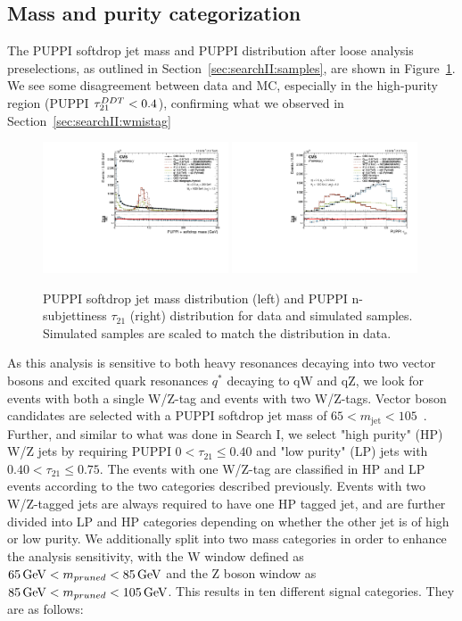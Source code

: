 \subsection{Mass and purity categorization}
The PUPPI softdrop jet mass and PUPPI \nsubj distribution after loose analysis preselections, as outlined in Section~\ref{sec:searchII:samples}, are shown in Figure~\ref{fig:searchII:wtag}.
We see some disagreement between data and MC, especially in the high-purity region (PUPPI $\tau_{21}^{DDT}<0.4$), confirming what we observed in Section~\ref{sec:searchII:wmistag}
\begin{figure}[h!]
\centering
\includegraphics[width=0.49\textwidth]{figures/analysis/search2/AN-16-235/plots/qcdcp_PuppiSoftdropMass.pdf}
\includegraphics[width=0.49\textwidth]{figures/analysis/search2/AN-16-235/plots/qcdcp_puppi_tau2tau1.pdf}
\caption{PUPPI softdrop jet mass distribution (left) and PUPPI n-subjettiness $\tau_{21}$ (right) distribution for data and simulated samples. Simulated samples are scaled to match the distribution in data.}
\label{fig:searchII:wtag}
\end{figure}
As this analysis is sensitive to both heavy resonances decaying into two vector bosons and excited quark resonances $q^*$ decaying to qW and qZ, we look for events with both a single W/Z-tag and events with two W/Z-tags. 
Vector boson candidates are selected with a PUPPI softdrop jet mass of $65<m_{\mathrm{jet}}<105$~\GeV. Further, and similar to what was done in Search I, we select "high purity" (HP) W/Z jets by requiring  PUPPI $0<\tau_{21} \leq 0.40$ and "low purity" (LP) jets with $0.40<\tau_{21}\leq0.75$. The events with one W/Z-tag are classified in HP and LP events according to the two categories described previously. Events with two W/Z-tagged jets are always required to have one HP tagged jet, and are further divided into LP and HP categories depending on whether the other jet is of high or low purity. We additionally split into two mass categories in order to enhance the analysis sensitivity, with the W window defined as $65 {\,\text{Ge\hspace{-.08em}V}} < m_{pruned} < 85 {\,\text{Ge\hspace{-.08em}V}}$ and the Z boson window as $85 {\,\text{Ge\hspace{-.08em}V}} < m_{pruned} < 105 {\,\text{Ge\hspace{-.08em}V}}$. This results in ten different signal categories. They are as follows:
